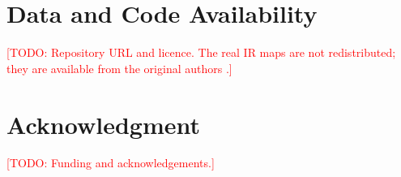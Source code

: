 \documentclass[journal]{IEEEtran}
\newcommand{\todo}[1]{\textcolor{red}{[TODO: #1]}}
\begin{document}
\section*{Data and Code Availability}
\todo{Repository URL and licence. The real IR maps are not redistributed; they are available from the original authors \cite{lu2024dataset}.}

\section*{Acknowledgment}
\todo{Funding and acknowledgements.}



\end{document}
